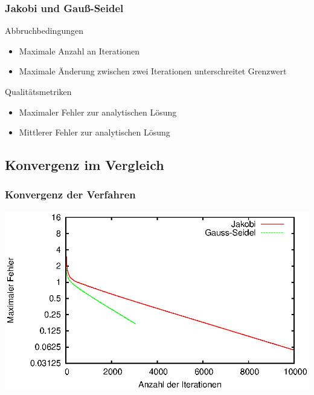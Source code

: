 \documentclass{beamer}
\begin{document}
\begin{frame}
    \frametitle{Jakobi und Gauß-Seidel}
    \begin{block}{Abbruchbedingungen}
        \begin{itemize}
            \item Maximale Anzahl an Iterationen
            \item Maximale Änderung zwischen zwei Iterationen unterschreitet Grenzwert
        \end{itemize}
    \end{block}
    \begin{block}{Qualitätsmetriken}
        \begin{itemize}
            \item Maximaler Fehler zur analytischen Lösung
            \item Mittlerer Fehler zur analytischen Lösung
        \end{itemize}
    \end{block}
\end{frame}

\subsection{Konvergenz im Vergleich}
\begin{frame}
    \frametitle{Konvergenz der Verfahren}
    \includegraphics[width=\textwidth]{fehlerpresentation}
\end{frame}
\end{document}
